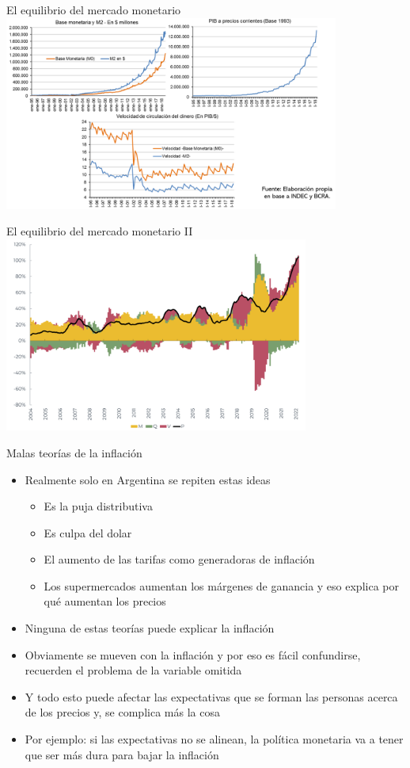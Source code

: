 \documentclass{beamer}
\begin{document}
\begin{frame}{El equilibrio del mercado monetario}
\centering\includegraphics[width=11cm]{Slides Principios de Economia/Figures/P56.png}\
\end{frame}

\begin{frame}{El equilibrio del mercado monetario II}
\centering\includegraphics[width=10cm]{Slides Principios de Economia/Figures/38.9.pdf}\
\end{frame}

\begin{frame}{Malas teorías de la inflación}
    \begin{itemize}
        \item Realmente solo en Argentina se repiten estas ideas
            \begin{itemize}
        \item Es la puja distributiva
        \item Es culpa del dolar
        \item El aumento de las tarifas como generadoras de inflación
        \item Los supermercados aumentan los márgenes de ganancia y eso explica por qué aumentan los precios
            \end{itemize}
        \item Ninguna de estas teorías puede explicar la inflación
        \item Obviamente se mueven con la inflación y por eso es fácil confundirse, recuerden el problema de la variable omitida
        \item Y todo esto puede afectar las expectativas que se forman las personas acerca de los precios y, se complica más la cosa
        \item Por ejemplo: si las expectativas no se alinean, la política monetaria va a tener que ser más dura para bajar la inflación
    \end{itemize}
\end{frame}
\end{document}
